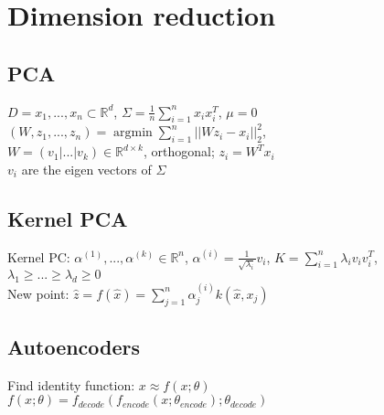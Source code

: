 \section*{Dimension reduction}
\subsection*{PCA}
\noindent $D={x_1,...,x_n} \subset \mathbb{R}^d$,
$\Sigma = \frac{1}{n}\sum_{i=1}^n x_i x_i^T$, $\mu = 0$\\
$(W,z_1,...,z_n) = \operatorname{argmin} \sum_{i=1}^n||W z_i - x_i||_2^2$,\\
$W = (v_1|...|v_k) \in \mathbb{R}^{d \times k}$, orthogonal; $z_i = W^T x_i$ \\ 
$v_i$ are the eigen vectors of $\Sigma$

\subsection*{Kernel PCA}
\noindent Kernel PC: $\alpha^{(1)},...,\alpha^{(k)}\in \mathbb{R}^n$, $\alpha^{(i)} = \frac{1}{\sqrt{\lambda_i}}v_i$, $K = \sum_{i=1}^n \lambda_i v_i v_i^T$, $\lambda_1 \geq ... \geq \lambda_d \geq 0$\\
New point: $\hat{z} = f(\hat{x}) = \sum_{j=1}^n\alpha_j^{(i)}k(\hat{x},x_j)$

\subsection*{Autoencoders}
\noindent Find identity function: $x \approx f(x;\theta)$\\
$f(x;\theta) = f_{decode}(f_{encode}(x;\theta_{encode});\theta_{decode})$